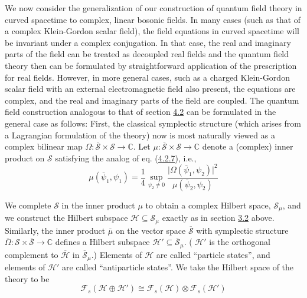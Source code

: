 \documentclass[11pt,a4paper]{article}
\begin{document}
We now consider the generalization of our construction of quantum field theory in curved spacetime to complex, linear bosonic \hypertarget{source-115}{} fields. In many cases (such as that of a complex Klein-Gordon scalar field), the field equations in curved spacetime will be invariant under a complex conjugation. In that case, the real and imaginary parts of the field can be treated as decoupled real fields and the quantum field theory then can be formulated by straightforward application of the prescription for real fields. However, in more general cases, such as a charged Klein-Gordon scalar field with an external electromagnetic field also present, the equations are complex, and the real and imaginary parts of the field are coupled. The quantum field construction analogous to that of section \hyperlink{sec:4.2}{4.2} can be formulated in the general case as follows: First, the classical symplectic structure (which arises from a Lagrangian formulation of the theory) now is most naturally viewed as a complex bilinear map \(\Omega: \overline{\mathcal{S}} \times \mathcal{S} \to \mathbb{C}\). Let \(\mu: \overline{\mathcal{S}} \times \mathcal{S} \to \mathbb{C}\) denote a (complex) inner product on \(\mathcal{S}\) satisfying the analog of eq. (\hyperref[eq:4.2.7]{4.2.7}), i.e.,
\begin{equation*}
\mu(\bar\psi_1,\psi_1)=\frac14\sup_{\psi_2\ne0}\frac{\lvert\Omega(\bar\psi_1,\psi_2)\rvert^2}{\mu(\bar\psi_2,\psi_2)} \tag{4.7.2}\label{eq:4.7.2}
\end{equation*}

We complete \(\mathcal{S}\) in the inner product \(\mu\) to obtain a complex Hilbert space, \(\mathcal{S}_{\mu}\), and we construct the Hilbert subspace \(\mathcal{H} \subseteq \mathcal{S}_{\mu}\) exactly as in section \hyperlink{sec:3.2}{3.2} above. Similarly, the inner product \(\overline{\mu}\) on the vector space \(\overline{\mathcal{S}}\) with symplectic structure \(\overline{\Omega}: \mathcal{S} \times \overline{\mathcal{S}} \to \mathbb{C}\) defines a Hilbert subspace \(\mathcal{H}' \subseteq \overline{\mathcal{S}}_{\mu}\). ( \(\mathcal{H}'\) is the orthogonal complement to \(\overline{\mathcal{H}}\) in \(\overline{\mathcal{S}}_{\mu}\).) Elements of \(\mathcal{H}\) are called ``particle states'', and elements of \(\mathcal{H}'\) are called ``antiparticle states''. We take the Hilbert space of the theory to be
\begin{equation*}
\mathcal{F}_{s}(\mathcal{H} \oplus \mathcal{H}') \cong \mathcal{F}_{s}(\mathcal{H}) \otimes \mathcal{F}_{s}(\mathcal{H}') \tag{4.7.3}\label{eq:4.7.3}
\end{equation*}
\end{document}
